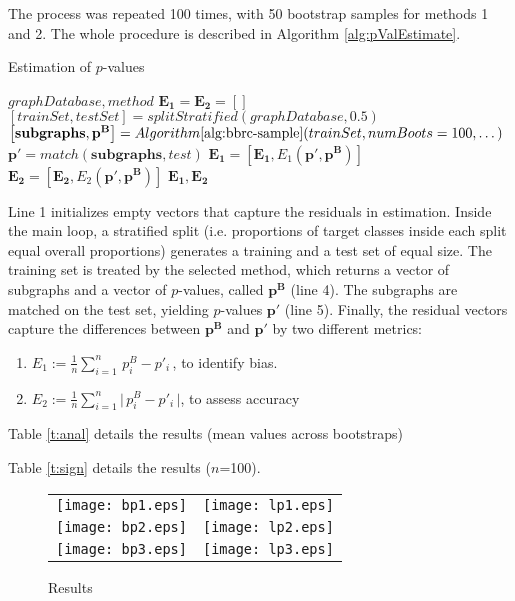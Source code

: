\documentclass{article}
\begin{document}
The process was repeated 100 times, with 50 bootstrap samples for methods 1 and 2. The whole procedure is described in Algorithm \ref{alg:pValEstimate}.
\begin{algorithm}
  \caption{Estimation of $p$-values}
  \label{alg:pValEstimate}
\begin{algorithmic}[1]
  \Require $graphDatabase, method$ 
  \State $\mathbf{E_1}=\mathbf{E_2}=\left[ \right]$
    \State $[trainSet, testSet] = splitStratified(graphDatabase,0.5)$ 
    \State $\left[ \mathbf{subgraphs}, \mathbf{p^B} \right] = Algorithm \ref{alg:bbrc-sample}(trainSet,numBoots=100,\dots)$ 
    \State $\mathbf{p'} = match(\mathbf{subgraphs}, test)$ 
    \State $ \mathbf{E_1} = \left[ \mathbf{E_1}, E_1(\mathbf{p'}, \mathbf{p^B}) \right]$
    \State $ \mathbf{E_2} = \left[ \mathbf{E_2}, E_2(\mathbf{p'}, \mathbf{p^B}) \right]$
  \EndFor
  \Ensure $\mathbf{E_1},\mathbf{E_2}$
\end{algorithmic}
\end{algorithm}

Line 1 initializes empty vectors that capture the residuals in
estimation. Inside the main loop, a stratified split (i.e. proportions of
target classes inside each split equal overall proportions) generates a training
and a test set of equal size. The training set is treated by the selected method,
which returns a vector of subgraphs and a vector of $p$-values, called
$\mathbf{p^B}$ (line 4). The subgraphs are matched on the test set, yielding
$p$-values $\mathbf{p'}$ (line 5). Finally, the residual vectors capture the
differences between $\mathbf{p^B}$ and  $\mathbf{p'}$ by two different metrics:

\begin{enumerate}
  \item $E_1 := \frac{1}{n} \sum_{i=1}^n \,p^B_i -p'_i \,$, to identify bias.
  \item $E_2 := \frac{1}{n} \sum_{i=1}^n \Big|\,p^B_i -p'_i \,\Big|$, to assess accuracy
\end{enumerate}

Table \ref{t:anal} details the results (mean values across bootstraps)


Table \ref{t:sign} details the results ($n$=100). 


\begin{figure}[t]
  \begin{tabular}{cc}
   \texttt{[image: bp1.eps]} & \texttt{[image: lp1.eps]} \\
   \texttt{[image: bp2.eps]} & \texttt{[image: lp2.eps]} \\
   \texttt{[image: bp3.eps]} & \texttt{[image: lp3.eps]} \\
  \end{tabular}
  \caption{Results}
  \label{fig:bplp13}
\end{figure}
\end{document}

